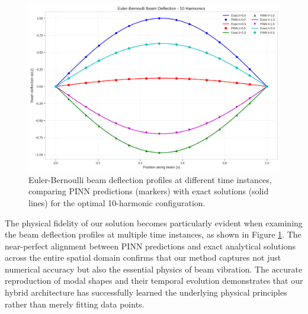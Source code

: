 \begin{figure}[ht]
    \centering
    \includegraphics[width = 1.0\linewidth]{figures/euler_bernoulli_beam_10h.png}
    \caption{Euler-Bernoulli beam deflection profiles at different time instances, comparing PINN predictions (markers) with exact solutions (solid lines) for the optimal 10-harmonic configuration.}
    \label{fig:beam_deflection}
\end{figure}

The physical fidelity of our solution becomes particularly evident when examining the beam deflection profiles at multiple time instances, as shown in Figure \ref{fig:beam_deflection}. The near-perfect alignment between PINN predictions and exact analytical solutions across the entire spatial domain confirms that our method captures not just numerical accuracy but also the essential physics of beam vibration. The accurate reproduction of modal shapes and their temporal evolution demonstrates that our hybrid architecture has successfully learned the underlying physical principles rather than merely fitting data points.


